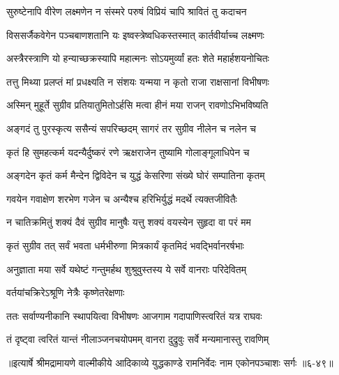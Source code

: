 \twolineshloka
{सुरुष्टेनापि वीरेण लक्ष्मणेन न संस्मरे}
{परुषं विप्रियं चापि श्रावितं तु कदाचन} %

\twolineshloka
{विससर्जैकवेगेन पञ्चबाणशतानि यः}
{इष्वस्त्रेष्वधिकस्तस्मात् कार्तवीर्याच्च लक्ष्मणः} %

\twolineshloka
{अस्त्रैरस्त्राणि यो हन्याच्छक्रस्यापि महात्मनः}
{सोऽयमुर्व्यां हतः शेते महार्हशयनोचितः} %

\twolineshloka
{तत्तु मिथ्या प्रलप्तं मां प्रधक्ष्यति न संशयः}
{यन्मया न कृतो राजा राक्षसानां विभीषणः} %

\twolineshloka
{अस्मिन् मुहूर्ते सुग्रीव प्रतियातुमितोऽर्हसि}
{मत्वा हीनं मया राजन् रावणोऽभिभविष्यति} %

\twolineshloka
{अङ्गदं तु पुरस्कृत्य ससैन्यं सपरिच्छदम्}
{सागरं तर सुग्रीव नीलेन च नलेन च} %

\twolineshloka
{कृतं हि सुमहत्कर्म यदन्यैर्दुष्करं रणे}
{ऋक्षराजेन तुष्यामि गोलाङ्गूलाधिपेन च} %

\twolineshloka
{अङ्गदेन कृतं कर्म मैन्देन द्विविदेन च}
{युद्धं केसरिणा संख्ये घोरं सम्पातिना कृतम्} %

\twolineshloka
{गवयेन गवाक्षेण शरभेण गजेन च}
{अन्यैश्च हरिभिर्युद्धं मदर्थे त्यक्तजीवितैः} %

\twolineshloka
{न चातिक्रमितुं शक्यं दैवं सुग्रीव मानुषैः}
{यत्तु शक्यं वयस्येन सुहृदा वा परं मम} %

\twolineshloka
{कृतं सुग्रीव तत् सर्वं भवता धर्मभीरुणा}
{मित्रकार्यं कृतमिदं भवद्भिर्वानरर्षभाः} %

\twolineshloka
{अनुज्ञाता मया सर्वे यथेष्टं गन्तुमर्हथ}
{शुश्रुवुस्तस्य ये सर्वे वानराः परिदेवितम्} %

\onelineshloka
{वर्तयांचक्रिरेऽश्रूणि नेत्रैः कृष्णेतरेक्षणाः} %

\twolineshloka
{ततः सर्वाण्यनीकानि स्थापयित्वा विभीषणः}
{आजगाम गदापाणिस्त्वरितं यत्र राघवः} %

\twolineshloka
{तं दृष्ट्वा त्वरितं यान्तं नीलाञ्जनचयोपमम्}
{वानरा दुद्रुवुः सर्वे मन्यमानास्तु रावणिम्} %


॥इत्यार्षे श्रीमद्रामायणे वाल्मीकीये आदिकाव्ये युद्धकाण्डे रामनिर्वेदः नाम एकोनपञ्चाशः सर्गः ॥६-४९॥
